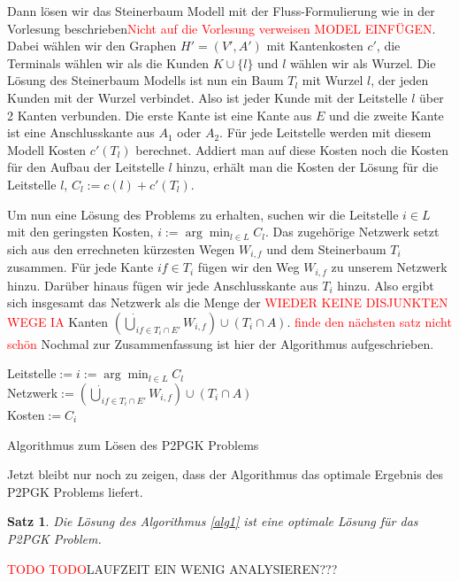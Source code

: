 \documentclass[11pt,a4paper]{article}
\makeatletter
\newcommand{\TODO}{\textcolor{red}{TODO}}
\theoremstyle{my_th_style1}
\newtheorem{satz}{Satz}
\renewenvironment{proof}[1][\proofname]{\par 
	\pushQED{\qed}%
	\normalfont \topsep6\p@\@plus6\p@\relax 
	\trivlist 
	\item[\hskip\labelsep 
	\bfseries 
	#1\@addpunct{:}]\ignorespaces 
}{%
\popQED\endtrivlist\@endpefalse 
}
\makeatother
\begin{document}
Dann lösen wir das Steinerbaum Modell mit der Fluss-Formulierung wie in der Vorlesung beschrieben\textcolor{red}{Nicht auf die Vorlesung verweisen MODEL EINFÜGEN}. Dabei wählen wir den Graphen $H'=(V',A')$ mit Kantenkosten $c'$, die Terminals wählen wir als die Kunden $K \cup \{l\}$ und $l$ w\"ahlen wir als Wurzel. 
Die Lösung des Steinerbaum Modells ist nun ein Baum $T_l$ mit Wurzel $l$, der jeden Kunden mit der Wurzel verbindet. 
Also ist jeder Kunde mit der Leitstelle $l$ über 2 Kanten verbunden. Die erste Kante ist eine Kante aus $E$ und die zweite Kante ist eine Anschlusskante aus $A_1$ oder $A_2$. 
Für jede Leitstelle werden mit diesem Modell Kosten $c'(T_l)$ berechnet. 
Addiert man auf diese Kosten noch die Kosten für den Aufbau der Leitstelle $l$ hinzu, erhält man die Kosten der Lösung für die Leitstelle \(l\), $C_l:=c(l)+c'(T_l)$.

Um nun eine Lösung des Problems zu erhalten, suchen wir die Leitstelle $i \in L$ mit den geringsten Kosten, $i:=\arg \displaystyle\min_{l \in L} C_l$. Das zugehörige Netzwerk setzt sich aus den errechneten kürzesten Wegen  $W_{i,f}$ und dem Steinerbaum $T_i$ zusammen. Für jede Kante $if \in T_i$ fügen wir den Weg $W_{i,f}$ zu unserem Netzwerk hinzu. Darüber hinaus fügen wir jede Anschlusskante aus $T_i$ hinzu. Also ergibt sich insgesamt das Netzwerk als die Menge der \textcolor{red}{WIEDER KEINE DISJUNKTEN WEGE IA} Kanten $(\dot{\bigcup}_{if \in T_i \cap E'}W_{i,f}) \cup (T_i\cap A)$.
\textcolor{red}{finde den n\"achsten satz nicht sch\"on}
Nochmal zur Zusammenfassung ist hier der Algorithmus aufgeschrieben.

\vspace{0.5cm}
\begin{algorithm}[H]
	\label{alg1}
\BlankLine

	Leitstelle$:=i:=\arg \displaystyle\min_{l \in L} C_l$\\
	Netzwerk$:=(\dot{\bigcup}_{if \in T_i \cap E'}W_{i,f}) \cup (T_i\cap A)$\\
	Kosten$:=C_{i}$
	\BlankLine
\caption{Algorithmus zum Lösen des P2PGK Problems}
\end{algorithm}
\vspace{0.5cm}
Jetzt bleibt nur noch zu zeigen, dass der Algorithmus das optimale Ergebnis des P2PGK Problems liefert.
\begin{satz}
	Die Lösung des Algorithmus \ref{alg1} ist eine optimale Lösung für das P2PGK Problem.
\end{satz}
\begin{proof}
	\TODO
\end{proof}
\TODO LAUFZEIT EIN WENIG ANALYSIEREN???
\end{document}
